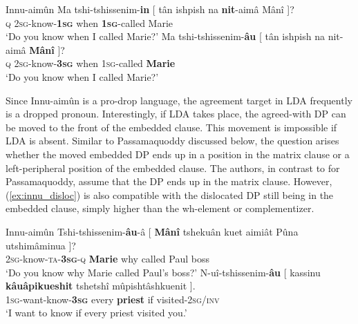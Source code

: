 \documentclass[output=paper
,modfonts
,nonflat]{langsci/langscibook}
\begin{document}
\begin{exe}
\ex Innu-aim\^{u}n \citep[][399]{Branigan_MacKenzie2002} \label{ex:innu_int}
	\xlist
	\ex	\label{ex:innu_q_subj}
		\gll Ma tshi-tshissenim-\textbf{in} [ {t\^{a}n ishpish na} \textbf{nit}-aim\^{a} M\^{a}n\^{i} ]?\\
			 \textsc{q} \textsc{2sg}-know-\textbf{\textsc{1sg}} {} when \textbf{\textsc{1sg}}-called Marie\\
		\glt `Do you know when I called Marie?'
	\ex \label{ex:innu_q_obj}
		\gll Ma tshi-tshissenim-\textbf{\^{a}u} [ {t\^{a}n ishpish na} nit-aim\^{a} \textbf{M\^{a}n\^{i}} ]?\\
			 \textsc{q} \textsc{2sg}-know-\textbf{\textsc{3sg}} {} when \textsc{1sg}-called \textbf{Marie}\\
		\glt `Do you know when I called Marie?'
	\endxlist
\end{exe}
Since Innu-aim\^{u}n is a pro-drop language, the agreement target in LDA frequently is a dropped pronoun. Interestingly, if LDA takes place, the agreed-with DP can be moved to the front of the embedded clause. This movement is impossible if LDA is absent. Similar to Passamaquoddy discussed below, the question arises whether the moved embedded DP ends up in a position in the matrix clause or a left-peripheral position of the embedded clause. The authors, in contrast to \citet{Bruening2001a} for Passamaquoddy, assume that the DP ends up in the matrix clause. However, (\ref{ex:innu_disloc}) is also compatible with the dislocated DP still being in the embedded clause, simply higher than the wh-element or complementizer. %
\begin{exe}
\ex Innu-aim\^{u}n \citep[][389]{Branigan_MacKenzie2002} \label{ex:innu_disloc}
	\xlist
	\ex	
		\gll Tshi-tshissenim-\textbf{\^{a}u}-\^{a} [ \textbf{M\^{a}n\^{i}} tsheku\^{a}n {kuet aimi\^{a}t} P\^{u}na utshim\^{a}minua ]?\\
			 \textsc{2sg}-know-\textsc{ta}-\textbf{\textsc{3sg}}-\textsc{q} {} \textbf{Marie} why called Paul boss\\
		\glt `Do you know why Marie called Paul's boss?'
	\ex \label{ex:innu_q}
		\gll N-u\^{i}-tshissenim-\textbf{\^{a}u} [ kassinu \textbf{k\^{a}u\^{a}pikueshit} tshetsh\^{i} m\^{u}pisht\^{a}shkuenit ].\\
			 \textsc{1sg}-want-know-\textbf{\textsc{3sg}} {} every \textbf{priest} if visited-\textsc{2sg}/\textsc{inv}\\
		\glt `I want to know if every priest visited you.'
	\endxlist
\end{exe}
\end{document}
